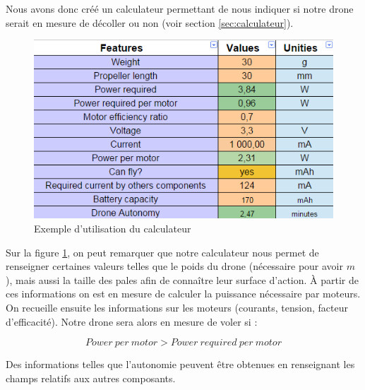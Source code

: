 \documentclass[a4paper,10pt]{report}
\begin{document}
	Nous avons donc créé un calculateur permettant de nous indiquer si 
notre drone serait en mesure de décoller ou non (voir section 
\ref{sec:calculateur}). 

	  \begin{figure}[htbp]
	    \centering
	    \includegraphics[scale = 0.5]{img/calculateur.png}
	    \caption{Exemple d'utilisation du calculateur}
	    \label{calculateur}
	  \end{figure}

	Sur la figure \ref{calculateur}, on peut remarquer que notre 
calculateur nous permet de renseigner certaines valeurs telles que le poids du 
drone (nécessaire pour avoir $m$), mais aussi la taille des pales afin de 
connaître leur surface d'action. À partir de ces informations on est en mesure 
de calculer la puissance nécessaire par moteurs. On recueille ensuite les 
informations sur les moteurs (courants, tension, facteur d'efficacité). 
Notre drone sera alors en mesure de voler si :

	\begin{equation}
	  Power \ per \ motor > Power \ required \ per \ motor 
	\end{equation}

	Des informations telles que l'autonomie peuvent être obtenues en 
renseignant les champs relatifs aux autres composants.

  \listoffigures
  
  \raggedright
  
  
\end{document}
